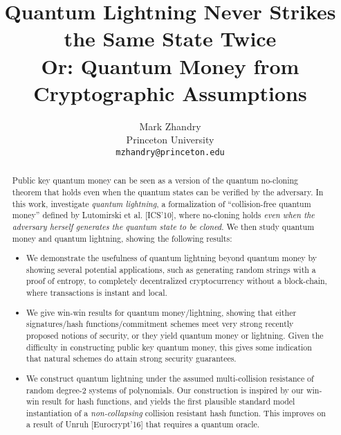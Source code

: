 \documentclass[letterpaper,11pt]{article}
\begin{document}
\title{Quantum Lightning Never Strikes the Same State Twice \\\vspace{0.3em} \large{Or: Quantum Money from Cryptographic Assumptions}}
\author{{\sc Mark Zhandry} \\
Princeton University\\
    	{\tt mzhandry@princeton.edu} }

\date{}
\maketitle

\begin{abstract} Public key quantum money can be seen as a version of the quantum no-cloning theorem that holds even when the quantum states can be verified by the adversary.  In this work, investigate \emph{quantum lightning}, a formalization of ``collision-free quantum money'' defined by Lutomirski et al. [ICS'10], where no-cloning holds \emph{even when the adversary herself generates the quantum state to be cloned}.  We then study quantum money and quantum lightning, showing the following results:

\begin{itemize}
	\item We demonstrate the usefulness of quantum lightning beyond quantum money by showing several potential applications, such as generating random strings with a proof of entropy, to completely decentralized cryptocurrency without a block-chain, where transactions is instant and local.
	
	\item We give win-win results for quantum money/lightning, showing that either signatures/hash functions/commitment schemes meet very strong recently proposed notions of security, or they yield quantum money or lightning.  Given the difficulty in constructing public key quantum money, this gives some indication that natural schemes do attain strong security guarantees.
	
	\item We construct quantum lightning under the assumed multi-collision resistance of random degree-2 systems of polynomials.  Our construction is inspired by our win-win result for hash functions, and yields the first plausible standard model instantiation of a \emph{non-collapsing} collision resistant hash function.  This improves on a result of Unruh [Eurocrypt'16] that requires a quantum oracle.  
	

\end{itemize}
\end{abstract}
\end{document}
